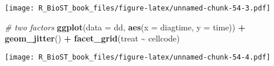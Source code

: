 \documentclass[
]{book}
\newenvironment{Shaded}{\begin{snugshade}}{\end{snugshade}}
\newcommand{\CommentTok}[1]{\textcolor[rgb]{0.56,0.35,0.01}{\textit{#1}}}
\newcommand{\DataTypeTok}[1]{\textcolor[rgb]{0.13,0.29,0.53}{#1}}
\newcommand{\KeywordTok}[1]{\textcolor[rgb]{0.13,0.29,0.53}{\textbf{#1}}}
\newcommand{\NormalTok}[1]{#1}
\newcommand{\OperatorTok}[1]{\textcolor[rgb]{0.81,0.36,0.00}{\textbf{#1}}}
\newcommand{\StringTok}[1]{\textcolor[rgb]{0.31,0.60,0.02}{#1}}
\begin{document}
\texttt{[image: R\_BioST\_book\_files/figure-latex/unnamed-chunk-54-3.pdf]}

\begin{Shaded}
\begin{Highlighting}[]
\CommentTok{\# two factors}
\KeywordTok{ggplot}\NormalTok{(}\DataTypeTok{data =}\NormalTok{ dd, }\KeywordTok{aes}\NormalTok{(}\DataTypeTok{x =}\NormalTok{ diagtime, }\DataTypeTok{y =}\NormalTok{ time)) }\OperatorTok{+}\StringTok{ }\KeywordTok{geom\_jitter}\NormalTok{() }\OperatorTok{+}\StringTok{ }
\StringTok{  }\KeywordTok{facet\_grid}\NormalTok{(treat }\OperatorTok{\textasciitilde{}}\StringTok{ }\NormalTok{cellcode)}
\end{Highlighting}
\end{Shaded}

\texttt{[image: R\_BioST\_book\_files/figure-latex/unnamed-chunk-54-4.pdf]}

  
\end{document}

